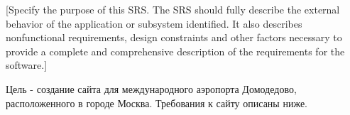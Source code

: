 [Specify the purpose of this SRS. The SRS should 
fully describe the external behavior of the 
application or subsystem identified. It also 
describes nonfunctional requirements, design 
constraints and other factors necessary to 
provide a complete and comprehensive description 
of the requirements for the software.]

Цель - создание сайта для международного
аэропорта Домодедово, расположенного в 
городе Москва. Требования к сайту описаны ниже.
